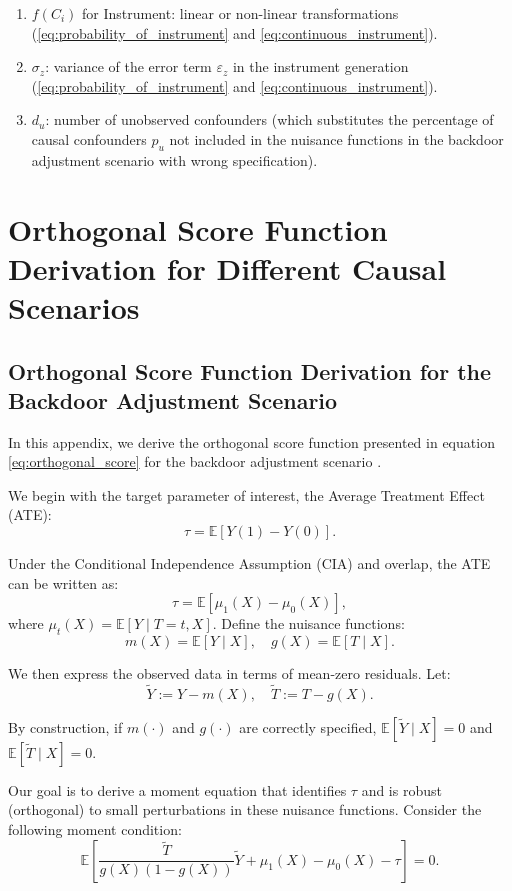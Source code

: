 \documentclass{article}
\numberwithin{equation}{section}
\begin{document}
\begin{enumerate}[label=\roman*.]
    \item $f(C_i)$ for Instrument: linear or non-linear transformations (\ref{eq:probability_of_instrument} and \ref{eq:continuous_instrument}).
    \item $\sigma_z$: variance of the error term $\varepsilon_z$ in the instrument generation (\ref{eq:probability_of_instrument} and \ref{eq:continuous_instrument}).
    \item $d_u$: number of unobserved confounders (which substitutes the percentage of causal confounders $p_u$ not included in the nuisance functions in the backdoor adjustment scenario with wrong specification).
\end{enumerate}

\section{Orthogonal Score Function Derivation for Different Causal Scenarios}

\subsection{Orthogonal Score Function Derivation for the Backdoor Adjustment Scenario}
\label{subsec:appendix_orthogonal_score_function_backdoor_adjustment}

In this appendix, we derive the orthogonal score function presented in equation \eqref{eq:orthogonal_score} for the backdoor adjustment scenario \cite{ChernozhukovChetverikovDemireretal2018, Pearl2009}.

We begin with the target parameter of interest, the Average Treatment Effect (ATE):
\[
\tau = \mathbb{E}[Y(1) - Y(0)].
\]

Under the Conditional Independence Assumption (CIA) and overlap, the ATE can be written as:
\[
\tau = \mathbb{E}[\mu_1(X) - \mu_0(X)],
\]
where \(\mu_t(X) = \mathbb{E}[Y \mid T=t,X]\). Define the nuisance functions:
\[
m(X) = \mathbb{E}[Y \mid X], \quad g(X) = \mathbb{E}[T \mid X].
\]

We then express the observed data in terms of mean-zero residuals. Let:
\[
\tilde{Y} := Y - m(X), \quad \tilde{T} := T - g(X).
\]

By construction, if \(m(\cdot)\) and \(g(\cdot)\) are correctly specified, \(\mathbb{E}[\tilde{Y} \mid X] = 0\) and \(\mathbb{E}[\tilde{T} \mid X] = 0\).

Our goal is to derive a moment equation that identifies \(\tau\) and is robust (orthogonal) to small perturbations in these nuisance functions. Consider the following moment condition:
\[
\mathbb{E}\left[ \frac{\tilde{T}}{g(X)(1-g(X))}\tilde{Y} + \mu_1(X)-\mu_0(X) - \tau \right] = 0.
\]
\end{document}

